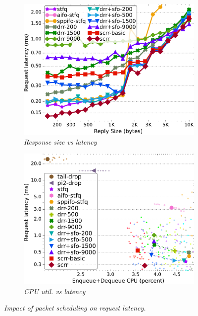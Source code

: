 \begin{figure}[t]
	\centering
 	\begin{subfigure}[t]{.49\linewidth}
		\centering
        \includegraphics[width=1\linewidth]{figs/pkt_size_cn_2t4x8_mn_2tb2x4_per_15_mss_1468_lat_comp_drr-200_scrr.pdf}
    \caption{\small{\textit{Response size vs latency}}}
	\label{fig:request-latency-sched}
	\end{subfigure}
	\begin{subfigure}[t]{.49\linewidth}
		\centering
    \includegraphics[width=1\linewidth]{figs/pkt_size_cn_2t4x8_mn_2tb2x4_per_15_mss_1468_kp_lat_comp_methods.pdf}
    \caption{\small{\textit{CPU util. vs latency}}}
	\label{fig:request-cpu-latency-all}
	\end{subfigure}
 \vspace{-3mm}
    \caption{\small{\textit{Impact of packet scheduling on request latency.}}}
  \vspace{-0.3cm}
\end{figure}

